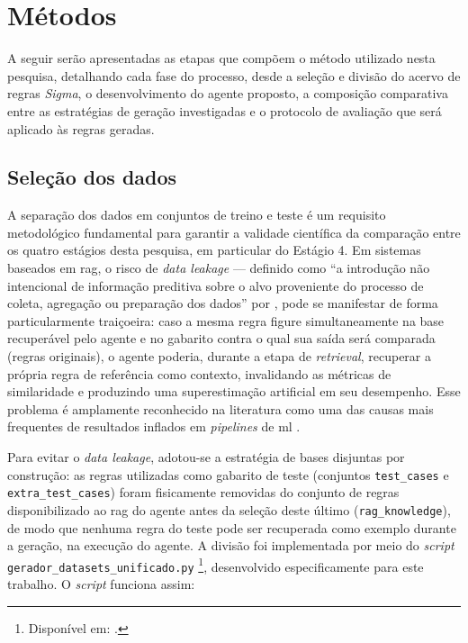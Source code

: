 \section{Métodos}\label{sec:metodo}

A seguir serão apresentadas as etapas que compõem o método utilizado nesta pesquisa, detalhando cada fase do processo, desde a seleção e divisão do acervo de regras \textit{Sigma}, o desenvolvimento do agente proposto, a composição comparativa entre as estratégias de geração investigadas e o protocolo de avaliação que será aplicado às regras geradas.

\subsection{Seleção dos dados}

A separação dos dados em conjuntos de treino e teste é um requisito metodológico fundamental para garantir a validade científica da comparação entre os quatro estágios desta pesquisa, em particular do Estágio 4. 
Em sistemas baseados em \gls{rag}, o risco de \textit{data leakage} --- definido como ``a introdução não intencional de informação preditiva sobre o alvo proveniente do processo de coleta, agregação ou preparação dos dados'' por , pode se manifestar de forma particularmente traiçoeira:
caso a mesma regra figure simultaneamente na base recuperável pelo agente e no gabarito contra o qual sua saída será comparada (regras originais), o agente poderia, durante a etapa de \textit{retrieval}, recuperar a própria regra de referência como contexto, invalidando as métricas de similaridade e produzindo uma superestimação artificial em seu desempenho. 
Esse problema é amplamente reconhecido na literatura como uma das causas mais frequentes de resultados inflados em \textit{pipelines} de \gls{ml} \cite{kaufman2012}. 

Para evitar o \textit{data leakage}, adotou-se a estratégia de bases disjuntas por construção: 
as regras utilizadas como gabarito de teste (conjuntos \texttt{test\_cases} e \texttt{extra\_test\_cases}) foram fisicamente removidas do conjunto de regras disponibilizado ao \gls{rag} do agente antes da seleção deste último (\texttt{rag\_knowledge}), de modo que nenhuma regra do teste pode ser recuperada como exemplo durante a geração, na execução do agente.
A divisão foi implementada por meio do \textit{script} \texttt{gerador\_datasets\_unificado.py}
\footnote{Disponível em: \url{}.}, 
desenvolvido especificamente para este trabalho.
O \textit{script} funciona assim:

